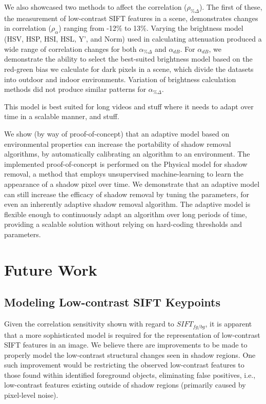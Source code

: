 \documentclass[12pt]{report}
\begin{document}
We also showcased two methods to affect the correlation ($\rho_{\%\Delta}$). The first of these, the measurement of low-contrast SIFT features in a scene, demonstrates changes in correlation ($\rho_{\alpha}$) ranging from -12\% to 13\%. Varying the brightness model (HSV, HSP, HSI, HSL, Y', and Norm) used in calculating attenuation produced a wide range of correlation changes for both $\alpha_{\%\Delta}$ and $\alpha_{dB}$. For $\alpha_{dB}$, we demonstrate the ability to select the best-suited brightness model based on the red-green bias we calculate for dark pixels in a scene, which divide the datasets into outdoor and indoor environments. Variation of brightness calculation methods did not produce similar patterns for $\alpha_{\%\Delta}$.

This model is best suited for long videos and stuff where it needs to adapt over time in a scalable manner, and stuff.

We show (by way of proof-of-concept) that an adaptive model based on environmental properties can increase the portability of shadow removal algorithms, by automatically calibrating an algorithm to an environment. The implemented proof-of-concept is performed on the Physical model for shadow removal, a method that employs unsupervised machine-learning to learn the appearance of a shadow pixel over time. We demonstrate that an adaptive model can still increase the efficacy of shadow removal by tuning the parameters, for even an inherently adaptive shadow removal algorithm. The adaptive model is flexible enough to continuously adapt an algorithm over long periods of time, providing a scalable solution without relying on hard-coding thresholds and parameters. 

\section{Future Work}

\subsection{Modeling Low-contrast SIFT Keypoints}

Given the correlation sensitivity shown with regard to $SIFT_{fg/bg}$, it is apparent that a more sophisticated model is required for the representation of low-contrast SIFT features in an image. We believe there are improvements to be made to properly model the low-contrast structural changes seen in shadow regions. One such improvement would be restricting the observed low-contrast features to those found within identified foreground objects, eliminating false positives, i.e., low-contrast features existing outside of shadow regions (primarily caused by pixel-level noise).
\end{document}
